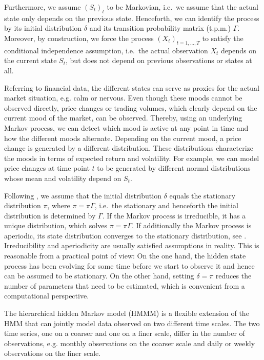 \documentclass[article]{jss}
\begin{document}
Furthermore, we assume $(S_t)_t$ to be Markovian, i.e.\ we assume that the actual state only depends on the previous state. Henceforth, we can identify the process by its initial distribution $\delta$ and its transition probability matrix (t.p.m.) $\Gamma$. Moreover, by construction, we force the process $(X_t)_{t = 1, \ldots, T}$ to satisfy the conditional independence assumption, i.e.\ the actual observation $X_t$ depends on the current state $S_t$, but does not depend on previous observations or states at all.

Referring to financial data, the different states can serve as proxies for the actual market situation, e.g. calm or nervous. Even though these moods cannot be observed directly, price changes or trading volumes, which clearly depend on the current mood of the market, can be observed. Thereby, using an underlying Markov process, we can detect which mood is active at any point in time and how the different moods alternate. Depending on the current mood, a price change is generated by a different distribution. These distributions characterize the moods in terms of expected return and volatility. For example, we can model price changes at time point $t$ to be generated by different normal distributions whose mean and volatility depend on $S_t$.

Following \cite{zuc16}, we assume that the initial distribution $\delta$ equals the stationary distribution $\pi$, where $\pi = \pi \Gamma$, i.e.\ the stationary and henceforth the initial distribution is determined by $\Gamma$. If the Markov process is irreducible, it has a unique distribution, which solves $\pi = \pi \Gamma$. If
additionally the Markov process is aperiodic, its state distribution converges to the stationary distribution, see \cite{nor97}. Irreducibility and aperiodicity are usually satisfied assumptions in reality. This is reasonable from a practical point of view: On the one hand, the hidden state process has been evolving for some time before we start to observe it and hence can be assumed to be stationary. On the other hand, setting $\delta=\pi$ reduces the number of parameters that need to be estimated, which is convenient from a computational perspective.

The hierarchical hidden Markov model (HMMM) is a flexible extension of the HMM  that can jointly model data observed on two different time scales. The two time series, one on a coarser and one on a finer scale, differ in the number of observations, e.g. monthly observations on the coarser scale and daily or weekly observations on the finer scale. 
\end{document}
